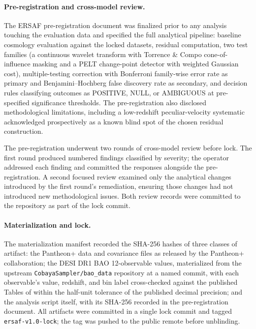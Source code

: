 \documentclass[11pt]{article}
\begin{document}
\paragraph{Pre-registration and cross-model review.}
The ERSAF pre-registration document was finalized prior to any
analysis touching the evaluation data and specified the full
analytical pipeline: baseline cosmology evaluation against the
locked datasets, residual computation, two test families (a
continuous wavelet transform with Torrence \& Compo cone-of-influence
masking and a PELT change-point detector with weighted Gaussian
cost), multiple-testing correction with Bonferroni family-wise error
rate as primary and Benjamini--Hochberg false discovery rate as
secondary, and decision rules classifying outcomes as POSITIVE,
NULL, or AMBIGUOUS at pre-specified significance thresholds. The
pre-registration also disclosed methodological limitations,
including a low-redshift peculiar-velocity systematic acknowledged
prospectively as a known blind spot of the chosen residual
construction.

The pre-registration underwent two rounds of cross-model review
before lock. The first round produced numbered findings classified
by severity; the operator addressed each finding and committed the
responses alongside the pre-registration. A second focused review
examined only the analytical changes introduced by the first
round's remediation, ensuring those changes had not introduced new
methodological issues. Both review records were committed to the
repository as part of the lock commit.

\paragraph{Materialization and lock.}
The materialization manifest recorded the SHA-256 hashes of three
classes of artifact: the Pantheon+ data and covariance files as
released by the Pantheon+ collaboration; the DESI DR1 BAO
12-observable values, materialized from the upstream
\texttt{CobayaSampler/bao\_data} repository at a named commit, with
each observable's value, redshift, and bin label cross-checked
against the published Tables of \cite{adame2024desi3,
adame2024desi4} within the half-unit tolerance of the published
decimal precision; and the analysis script itself, with its
SHA-256 recorded in the pre-registration document. All artifacts
were committed in a single lock commit and tagged
\texttt{ersaf-v1.0-lock}; the tag was pushed to the public remote
before unblinding.
\end{document}
